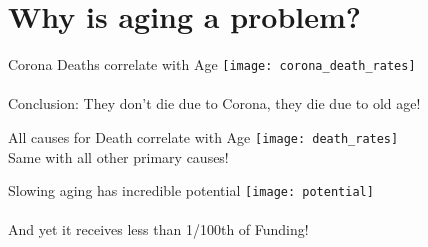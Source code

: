 \section{Why is aging a problem?}


\begin{frame}[c]{Corona Deaths correlate with Age}
    \large
    \texttt{[image: corona\_death\_rates]} \\
    \cite{10.1111/acel.13230} \\
    \pause
    Conclusion: They don't die due to Corona, they die due to old age!
\end{frame}


\begin{frame}[c]{All causes for Death correlate with Age}
    \large
    \texttt{[image: death\_rates]} \\
    \pause
    Same with all other primary causes!
\end{frame}


\begin{frame}[c]{Slowing aging has incredible potential}
    \large
    \texttt{[image: potential]} \\
    \cite{10.1093/ppar/prz022} \\
    \pause
    And yet it receives less than 1/100th of Funding!
\end{frame}


